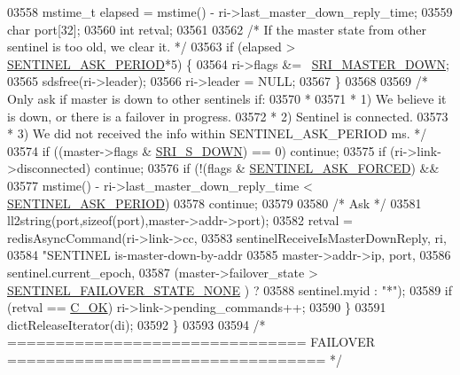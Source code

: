 \begin{DoxyCode}
{{{{{{{{{{{{{{{{{{{{{{{{{{{{{{{{{{{{{{{{{{{{{{{{{{{{{{{{{{{{{{{{{{{{{{{{{{{{{{{03558         mstime\_t elapsed = mstime() - ri->last\_master\_down\_reply\_time;
03559         \textcolor{keywordtype}{char} port[32];
03560         \textcolor{keywordtype}{int} retval;
03561 
03562         \textcolor{comment}{/* If the master state from other sentinel is too old, we clear it. */}
03563         \textcolor{keywordflow}{if} (elapsed > \hyperlink{sentinel_8c_a37ec7767004d923e7163195f50373d80}{SENTINEL\_ASK\_PERIOD}*5) \{
03564             ri->flags &= ~\hyperlink{sentinel_8c_a80003592a6337bdc484182ff1d33e41c}{SRI\_MASTER\_DOWN};
03565             sdsfree(ri->leader);
03566             ri->leader = NULL;
03567         \}
03568 
03569         \textcolor{comment}{/* Only ask if master is down to other sentinels if:}
03570 \textcolor{comment}{         *}
03571 \textcolor{comment}{         * 1) We believe it is down, or there is a failover in progress.}
03572 \textcolor{comment}{         * 2) Sentinel is connected.}
03573 \textcolor{comment}{         * 3) We did not received the info within SENTINEL\_ASK\_PERIOD ms. */}
03574         \textcolor{keywordflow}{if} ((master->flags & \hyperlink{sentinel_8c_a8e26596c8bde451c2dd9cecb2c3046d4}{SRI\_S\_DOWN}) == 0) \textcolor{keywordflow}{continue};
03575         \textcolor{keywordflow}{if} (ri->link->disconnected) \textcolor{keywordflow}{continue};
03576         \textcolor{keywordflow}{if} (!(flags & \hyperlink{sentinel_8c_a166080e23b7691124260c5ea1b053380}{SENTINEL\_ASK\_FORCED}) &&
03577             mstime() - ri->last\_master\_down\_reply\_time < 
      \hyperlink{sentinel_8c_a37ec7767004d923e7163195f50373d80}{SENTINEL\_ASK\_PERIOD})
03578             \textcolor{keywordflow}{continue};
03579 
03580         \textcolor{comment}{/* Ask */}
03581         ll2string(port,\textcolor{keyword}{sizeof}(port),master->addr->port);
03582         retval = redisAsyncCommand(ri->link->cc,
03583                     sentinelReceiveIsMasterDownReply, ri,
03584                     \textcolor{stringliteral}{"SENTINEL is-master-down-by-addr %
03585                     master->addr->ip, port,
03586                     sentinel.current\_epoch,
03587                     (master->failover\_state > \hyperlink{sentinel_8c_a23bad5aa23e7b1a930ad4aa535938efb}{SENTINEL\_FAILOVER\_STATE\_NONE}
      ) ?
03588                     sentinel.myid : \textcolor{stringliteral}{"*"});
03589         \textcolor{keywordflow}{if} (retval == \hyperlink{server_8h_a303769ef1065076e68731584e758d3e1}{C\_OK}) ri->link->pending\_commands++;
03590     \}
03591     dictReleaseIterator(di);
03592 \}
03593 
03594 \textcolor{comment}{/* =============================== FAILOVER ================================= */}
}}}}}}}}}}}}}}}}}}}}}}}}}}}}}}}}}}}}}}}}}}}}}}}}}}}}}}}}}}}}}}}}}}}}}}}}}}}}}}}}
\end{DoxyCode}
